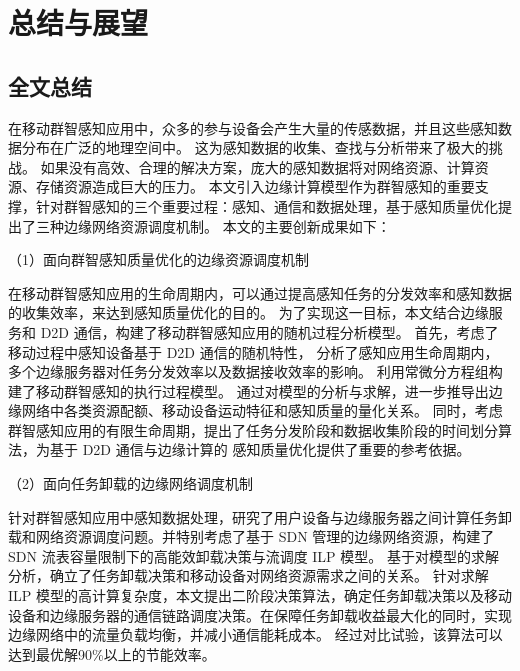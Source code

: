 \chapter{总结与展望}

\section{全文总结}


在移动群智感知应用中，众多的参与设备会产生大量的传感数据，并且这些感知数据分布在广泛的地理空间中。
这为感知数据的收集、查找与分析带来了极大的挑战。
如果没有高效、合理的解决方案，庞大的感知数据将对网络资源、计算资源、存储资源造成巨大的压力。
本文引入边缘计算模型作为群智感知的重要支撑，针对群智感知的三个重要过程：感知、通信和数据处理，基于感知质量优化提出了三种边缘网络资源调度机制。
本文的主要创新成果如下：

（1）面向群智感知质量优化的边缘资源调度机制

在移动群智感知应用的生命周期内，可以通过提高感知任务的分发效率和感知数据的收集效率，来达到感知质量优化的目的。
为了实现这一目标，本文结合边缘服务和 D2D 通信，构建了移动群智感知应用的随机过程分析模型。
首先，考虑了移动过程中感知设备基于 D2D 通信的随机特性，
分析了感知应用生命周期内，多个边缘服务器对任务分发效率以及数据接收效率的影响。
利用常微分方程组构建了移动群智感知的执行过程模型。
通过对模型的分析与求解，进一步推导出边缘网络中各类资源配额、移动设备运动特征和感知质量的量化关系。
同时，考虑群智感知应用的有限生命周期，提出了任务分发阶段和数据收集阶段的时间划分算法，为基于 D2D 通信与边缘计算的
感知质量优化提供了重要的参考依据。

（2）面向任务卸载的边缘网络调度机制

针对群智感知应用中感知数据处理，研究了用户设备与边缘服务器之间计算任务卸载和网络资源调度问题。并特别考虑了基于 SDN 管理的边缘网络资源，构建了 SDN 流表容量限制下的高能效卸载决策与流调度 ILP 模型。
基于对模型的求解分析，确立了任务卸载决策和移动设备对网络资源需求之间的关系。
针对求解 ILP 模型的高计算复杂度，本文提出二阶段决策算法，确定任务卸载决策以及移动设备和边缘服务器的通信链路调度决策。在保障任务卸载收益最大化的同时，实现边缘网络中的流量负载均衡，并减小通信能耗成本。
经过对比试验，该算法可以达到最优解90\%以上的节能效率。

